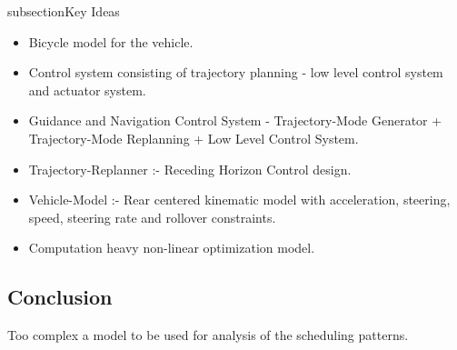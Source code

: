 subsection{Key Ideas}
\begin{itemize}
	\item Bicycle model for the vehicle.
	\item Control system consisting of trajectory planning - low level control system and actuator system.
	\item Guidance and Navigation Control System - Trajectory-Mode Generator + Trajectory-Mode Replanning + Low Level Control System.
	\item Trajectory-Replanner :- Receding Horizon Control design.
	\item Vehicle-Model :- Rear centered kinematic model with acceleration, steering, speed, steering rate and rollover constraints.
	\item Computation heavy non-linear optimization model.
\end{itemize}
\subsection{Conclusion}
Too complex a model to be used for analysis of the scheduling patterns.